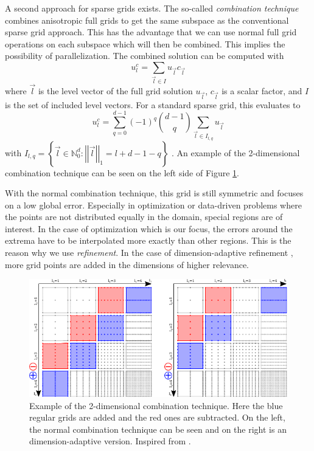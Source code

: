 A second approach for sparse grids exists. The so-called \textit{combination technique} \cite{griebel1990combination} combines anisotropic full grids to get the same subspace as the conventional sparse grid approach. This has the advantage that we can use normal full grid operations on each subspace which will then be combined. This implies the possibility of parallelization. The combined solution can be computed with 
\begin{equation}
	u_l^c = \sum_{ \vec{l} \in I } u_{\vec{l}} c_{\vec{l}}
\end{equation}
where $ \vec{l} $ is the level vector of the full grid solution $ u_{\vec{l}} $, $ c_{\vec{l}} $ is a scalar factor, and $ I $ is the set of included level vectors. For a standard sparse grid, this evaluates to 
\begin{equation}
	u_l^c = \sum_{ q = 0 }^{d-1} (-1)^q \binom{d-1}{q} \sum_{\vec{l} \in I_{l,q} } u_{\vec{l}}
\end{equation}
with $ I_{l,q} = \left\{ \vec{l} \in \mathbb{N}_0^d : \left|\left|\vec{l}\right|\right|_1 = l+d-1-q \right\} $ \cite{obersteiner2021generalized}. An example of the 2-dimensional combination technique can be seen on the left side of Figure \ref{fig:combi_technique}.

With the normal combination technique, this grid is still symmetric and focuses on a low global error. Especially in optimization or data-driven problems where the points are not distributed equally in the domain, special regions are of interest. In the case of optimization which is our focus, the errors around the extrema have to be interpolated more exactly than other regions. This is the reason why we use \textit{refinement}. In the case of dimension-adaptive refinement \cite{hegland2002adaptive}, more grid points are added in the dimensions of higher relevance. 

\begin{figure}[H]
	\centering
	\includegraphics[width=\textwidth]{figures/Fig_2_10_combi}
	\caption{ Example of the 2-dimensional combination technique. Here the blue regular grids are added and the red ones are subtracted. On the left, the normal combination technique can be seen and on the right is an dimension-adaptive version. Inspired from \cite{pfluger2010spatially}. }
	\label{fig:combi_technique}
\end{figure}


